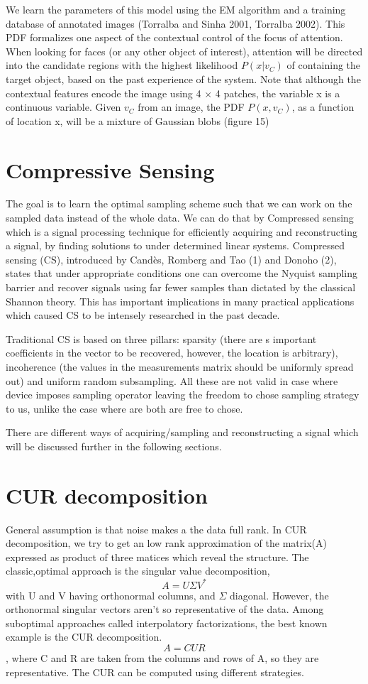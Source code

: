 \documentclass{article}
\begin{document}
We learn the parameters of this model using the EM algorithm and a training database of annotated images (Torralba and Sinha 2001, Torralba 2002). This PDF formalizes one aspect of the contextual control of the focus of attention. When looking for faces (or any other object
of interest), attention will be directed into the candidate regions with the highest likelihood $P(x|v_C)$ of containing the target object, based on the past experience of the system. Note that although the contextual features encode the image using 4 $\times$ 4 patches, the variable x is a
continuous variable. Given $v_C$ from an image, the PDF $P(x,v_C)$, as a function of location x, will be a mixture of Gaussian blobs (figure 15)

\section{Compressive Sensing}
The goal is to learn the optimal sampling scheme such that we can work on the sampled data instead of the whole data. We can do that by Compressed sensing which is a signal processing technique for efficiently acquiring and reconstructing a signal, by finding solutions to under determined linear systems. Compressed sensing (CS), introduced by Candès, Romberg and Tao (1) and Donoho (2), states that under appropriate conditions one can overcome the Nyquist sampling barrier and recover signals
using far fewer samples than dictated by the classical Shannon theory. This has important implications in many practical applications
which caused CS to be intensely researched in the past decade.

Traditional CS is based on three pillars: sparsity (there are s important coefficients in the vector to be recovered, however, the location is arbitrary), incoherence (the values in the measurements matrix
should be uniformly spread out) and uniform random subsampling. All these are not valid in case where device imposes sampling operator leaving the freedom to chose sampling strategy to us, unlike the case where are both are free to chose.

There are different ways of acquiring/sampling and reconstructing a signal which will be discussed further in the following sections.

\section{CUR decomposition}

General assumption is that noise makes a the data full rank. In CUR decomposition, we try to get an low rank approximation of the matrix(A) expressed as product of three matices which reveal the structure. The classic,optimal approach is the singular value decomposition, $$A = U\Sigma V^{*}$$ with U and V having orthonormal columns, and $\Sigma$ diagonal. However, the orthonormal singular vectors aren't so representative of the data. Among suboptimal approaches called interpolatory factorizations, the best known example is the CUR decomposition.$$A = CUR$$, where C and R are taken from the columns and rows of A, so they are representative. The CUR can be computed using different strategies.
\end{document}

